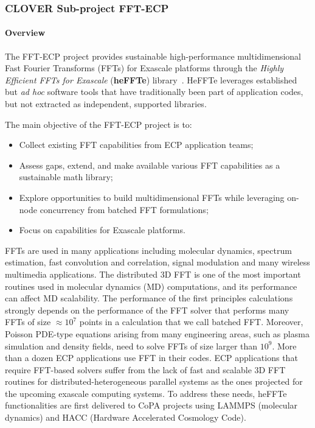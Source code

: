 \subsubsection{ CLOVER Sub-project FFT-ECP}\label{subsubsect:fftecp}


\paragraph{Overview}

The FFT-ECP project provides sustainable high-performance multidimensional
Fast Fourier Transforms (FFTs) for Exascale platforms through 
the {\it Highly Efficient FFTs for Exascale} ({\bf heFFTe}) library~\cite{thasd19}.
HeFFTe leverages established but {\it ad hoc} 
software tools that have traditionally been part of application 
codes, but not extracted as independent, supported libraries. 

The main objective of the FFT-ECP project is to:
\begin{itemize}
\item Collect existing FFT capabilities from ECP 
      application teams;
\item Assess gaps, extend, and make available various FFT
      capabilities as a sustainable math library;
\item Explore opportunities to build multidimensional FFTs
      while leveraging on-node concurrency from 
      batched FFT formulations;
\item Focus on capabilities for Exascale platforms.
\end{itemize}

FFTs are used in many applications including molecular dynamics, 
spectrum estimation, fast convolution and correlation, signal 
modulation and many wireless multimedia applications. The 
distributed 3D FFT is one of the most important routines used 
in molecular dynamics (MD) computations, and its performance can 
affect MD scalability. The performance of the first 
principles calculations strongly depends on the performance of the 
FFT solver that performs many FFTs of size $\approx 10^7$ points in 
a calculation that we call batched FFT. Moreover, Poisson PDE-type 
equations arising from many engineering areas, such as plasma
simulation and density fields, need to solve FFTs of size larger than $10^9$. 
%
More than a dozen ECP applications use FFT in their codes.
ECP applications that require FFT-based solvers suffer from the lack of 
fast and scalable 3D FFT routines for distributed-heterogeneous parallel 
systems as the ones projected for the upcoming exascale computing systems. 
To address these needs, heFFTe functionalities are first delivered 
to CoPA projects using LAMMPS (molecular dynamics) and HACC (Hardware Accelerated
Cosmology Code).

